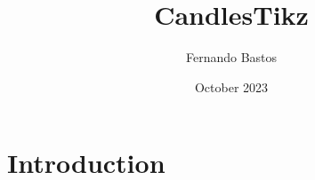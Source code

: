 \documentclass{article}
\title{CandlesTikz}
\author{Fernando Bastos}
\date{October 2023}
\begin{document}
\maketitle

\section{Introduction}

\end{document}

